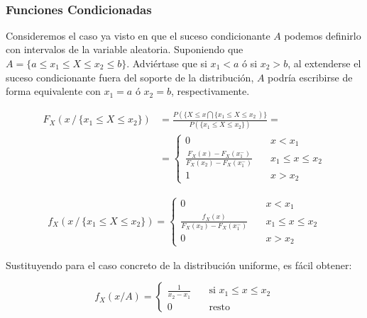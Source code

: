 \documentclass[11pt]{article}
\begin{document}
    \begin{center}
    \end{center}
    { \hspace*{\fill} \\}
    
    \hypertarget{funciones-condicionadas}{%
\subsubsection*{Funciones Condicionadas}\label{funciones-condicionadas}}

Consideremos el caso ya visto en que el suceso condicionante \(A\)
podemos definirlo con intervalos de la variable aleatoria. Suponiendo
que \(A=\{a \leq x_1\leq X \leq x_2 \leq b\}\). Adviértase que si
\(x_1 < a\) ó si \(x_2>b\), al extenderse el suceso condicionante fuera
del soporte de la distribución, \(A\) podría escribirse de forma
equivalente con \(x_1=a\) ó \(x_2=b\), respectivamente.

\begin{align*}
F_X(x\, /\, \{x_1\leq X \leq x_2\}) & = \frac{P(\{X \leq x \bigcap \{x_1\leq X \leq x_2\ )\} }{P(\{x_1\leq X \leq x_2\})}=\\
 & = \begin{cases}
    0       & \quad x < x_1\\
    \frac{F_X(x)-F_X(x_1^-)}{F_X(x_2)-F_X(x_1^-)}  & \quad x_1 \leq x \leq x_2\\
    1 &\quad x > x_2
  \end{cases}
\end{align*}

\begin{align*}
f_X(x\, /\, \{x_1\leq X \leq x_2\}) = \begin{cases}
    0       & \quad x < x_1\\
    \frac{f_X(x)}{F_X(x_2)-F_X(x_1^-)}  & \quad x_1 \leq x \leq x_2\\
    0 &\quad x > x_2
  \end{cases}
\end{align*}

    Sustituyendo para el caso concreto de la distribución uniforme, es fácil
obtener:

\[
f_X(x/A) =
\begin{cases}
    \frac{1}{x_2-x_1} & \quad \text{si } x_1\leq x \leq x_2\\
    0             & \quad \text{resto }
\end{cases}
\]
\end{document}

